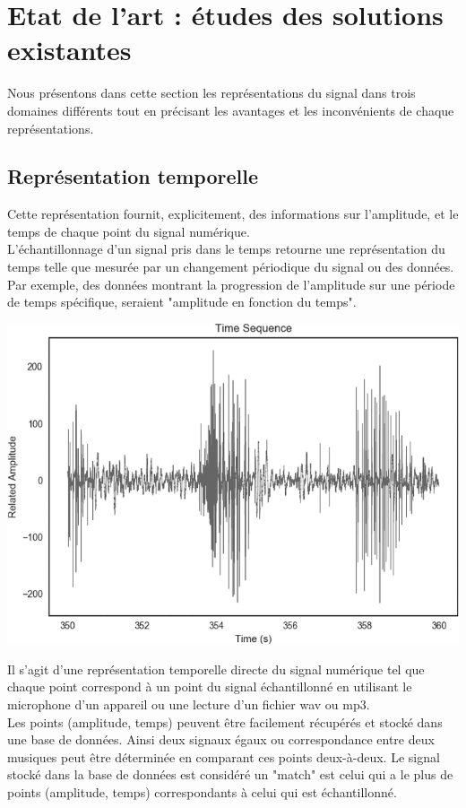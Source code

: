 \documentclass[11pt, report, french]{scrreprt}
\begin{document}
\newpage
\section{Etat de l’art : études des solutions existantes}
Nous présentons dans cette section les représentations du signal dans trois domaines différents tout en précisant les avantages et les inconvénients de chaque représentations.

\subsection{Représentation temporelle}
Cette représentation fournit, explicitement, des informations sur l’amplitude, et le temps de chaque point du signal numérique.\\

L'échantillonnage d'un signal pris dans le temps retourne une représentation du temps telle que mesurée par un changement périodique du signal ou des données. Par exemple, des données montrant la progression de l'amplitude sur une période de temps spécifique, seraient "amplitude en fonction du temps".\\

\begin{center}
	\includegraphics[scale=0.4]{img/signal_time_amp.png}
\end{center}

Il s'agit d'une représentation temporelle directe du signal numérique tel que chaque point correspond à un point du signal échantillonné en utilisant le microphone d'un appareil ou une lecture d'un fichier wav ou mp3.\\
Les points (amplitude, temps) peuvent être facilement récupérés et stocké dans une base de données. Ainsi deux signaux égaux ou correspondance entre deux musiques peut être déterminée en comparant ces points deux-à-deux. Le signal stocké dans la base de données est considéré un "match" est celui qui a le plus de points (amplitude, temps) correspondants à celui qui est échantillonné.\\\par
\end{document}
